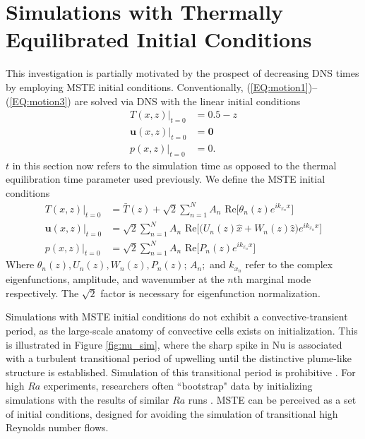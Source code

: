 \documentclass[reprint,amsmath,amssymb,aps]{revtex4-1}
\newcommand\Nu{\mathrm{Nu}}
\begin{document}
\section{Simulations with Thermally Equilibrated Initial Conditions}
This investigation is partially motivated by the prospect of decreasing DNS times by employing MSTE initial conditions. 
Conventionally, (\ref{EQ:motion1})--(\ref{EQ:motion3}) are solved via DNS with the linear initial conditions
\begin{align}
    T(x, z)\big|_{t=0} &= 0.5 - z \\
    \mathbf{u}(x, z)\big|_{t=0} &= \mathbf{0} \\
    p(x, z)\big|_{t=0} &= 0.
\end{align}
$t$ in this section now refers to the simulation time as opposed to the thermal equilibration time parameter used previously. 
We define the MSTE initial conditions
\begin{align}
    T(x, z)\big|_{t=0} &= \bar{T}(z) + \sqrt{2} \sum_{n=1}^N  A_n \text{ Re} \Big[ \theta_n(z) e^{ik_{x_n}x} \Big] \nonumber \\
    \mathbf{u}(x, z)\big|_{t=0} &= \sqrt{2} \sum_{n=1}^N A_n \text{ Re} \Big[\Big( U_n (z) \hat{x} + W_n(z) \hat{z} \Big) e^{ik_{x_n}x} \Big] \nonumber\\
    p(x, z)\big|_{t=0} &= \sqrt{2} \sum_{n=1}^N A_n \text{ Re} \Big[P_n (z) e^{ik_{x_n}x}\Big]
\end{align}
Where $\theta_n(z), U_n(z), W_n(z), P_n(z); \, A_n; $ and $k_{x_n}$ refer to the complex eigenfunctions, amplitude, and wavenumber at the $n$th marginal mode respectively. 
The $\sqrt{2}$ factor is necessary for eigenfunction normalization. 

Simulations with MSTE initial conditions do not exhibit a convective-transient period, as the large-scale anatomy of convective cells exists on initialization. 
This is illustrated in Figure \ref{fig:nu_sim}, where the sharp spike in $\Nu$ is associated with a turbulent transitional period of upwelling until the distinctive plume-like structure is established. 
Simulation of this transitional period is prohibitive \cite{Anders_AE}. 
For high $Ra$ experiments, researchers often ``bootstrap" data by initializing simulations with the results of similar $Ra$ runs \cite{Verzicco, Johnston}. 
MSTE can be perceived as a set of initial conditions, designed for avoiding the simulation of transitional high Reynolds number flows.
\end{document}
